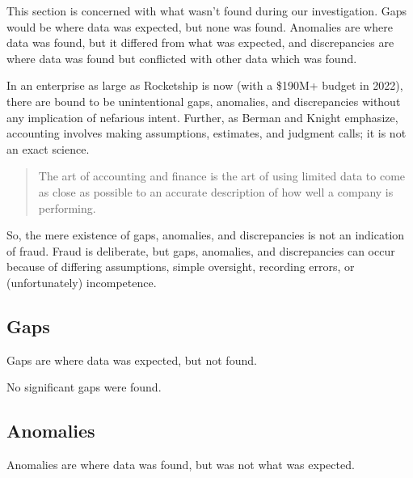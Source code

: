 This section is concerned with what wasn't found during our investigation. Gaps would be where data was expected, but none was found. Anomalies are where data was found, but it differed from what was expected, and discrepancies are where data was found but conflicted with other data which was found.

In an enterprise as large as Rocketship is now (with a \$190M+ budget in 2022), there are bound to be unintentional gaps, anomalies, and discrepancies without any implication of nefarious intent. Further, as Berman and Knight emphasize, accounting involves making assumptions, estimates, and judgment calls; it is not an exact science.
\begin{quotation}
  The art of accounting and finance is the art of using limited data to come as close as possible to an accurate description of how well a company is performing.
\end{quotation}

So, the mere existence of gaps, anomalies, and discrepancies is not an indication of fraud. Fraud is deliberate, but gaps, anomalies, and discrepancies can occur because of differing assumptions, simple oversight, recording errors, or (unfortunately)  incompetence.

\subsection{Gaps}\indent%
\label{sec:gaps}

Gaps are where data was expected, but not found.

No significant gaps were found.

\subsection{Anomalies}
\label{sec:anomalies}\indent%

Anomalies are where data was found, but was not what was expected.

